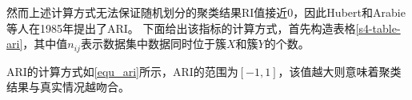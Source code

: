 然而上述计算方式无法保证随机划分的聚类结果RI值接近0，因此Hubert和Arabie等人在1985年提出了ARI。
下面给出该指标的计算方式，首先构造表格\ref{s4-table-ari}，其中值$ n_{ij} $表示数据集中数据同时位于簇$ X $和簇$ Y $的个数。

\begin{table}[htbp]
	\centering
	\renewcommand{\arraystretch}{1.3}
	\caption{ARI指标计算中间值}
	\label{s4-table-ari}
\end{table}

ARI的计算方式如\ref{equ_ari}所示，ARI的范围为$ [-1,1] $，该值越大则意味着聚类结果与真实情况越吻合。

